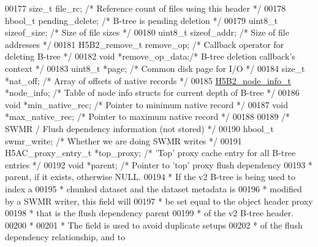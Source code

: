 \begin{DoxyCode}
{{00177     \textcolor{keywordtype}{size\_t}      file\_rc;        \textcolor{comment}{/* Reference count of files using this header */}
00178     hbool\_t     pending\_delete; \textcolor{comment}{/* B-tree is pending deletion */}
00179     uint8\_t     sizeof\_size;    \textcolor{comment}{/* Size of file sizes */}
00180     uint8\_t     sizeof\_addr;    \textcolor{comment}{/* Size of file addresses */}
00181     H5B2\_remove\_t remove\_op;    \textcolor{comment}{/* Callback operator for deleting B-tree */}
00182     \textcolor{keywordtype}{void}        *remove\_op\_data;\textcolor{comment}{/* B-tree deletion callback's context */}
00183     uint8\_t *page;          \textcolor{comment}{/* Common disk page for I/O */}
00184     \textcolor{keywordtype}{size\_t}      *nat\_off;       \textcolor{comment}{/* Array of offsets of native records */}
00185     \hyperlink{struct_h5_b2__node__info__t}{H5B2\_node\_info\_t} *node\_info; \textcolor{comment}{/* Table of node info structs for current depth of B-tree 
      */}
00186     \textcolor{keywordtype}{void}        *min\_native\_rec; \textcolor{comment}{/* Pointer to minimum native record                  */}
00187     \textcolor{keywordtype}{void}        *max\_native\_rec; \textcolor{comment}{/* Pointer to maximum native record                  */}
00188 
00189     \textcolor{comment}{/* SWMR / Flush dependency information (not stored) */}
00190     hbool\_t     swmr\_write;     \textcolor{comment}{/* Whether we are doing SWMR writes */}
00191     H5AC\_proxy\_entry\_t *top\_proxy;  \textcolor{comment}{/* 'Top' proxy cache entry for all B-tree entries */}
00192     \textcolor{keywordtype}{void}        *parent;        \textcolor{comment}{/* Pointer to 'top' proxy flush dependency}
00193 \textcolor{comment}{                                 * parent, if it exists, otherwise NULL.}
00194 \textcolor{comment}{                                 * If the v2 B-tree is being used to index a}
00195 \textcolor{comment}{                                 * chunked dataset and the dataset metadata is}
00196 \textcolor{comment}{                                 * modified by a SWMR writer, this field will}
00197 \textcolor{comment}{                                 * be set equal to the object header proxy}
00198 \textcolor{comment}{                                 * that is the flush dependency parent}
00199 \textcolor{comment}{                                 * of the v2 B-tree header.}
00200 \textcolor{comment}{                 *}
00201 \textcolor{comment}{                 * The field is used to avoid duplicate setups}
00202 \textcolor{comment}{                                 * of the flush dependency relationship, and to}
}}
\end{DoxyCode}
